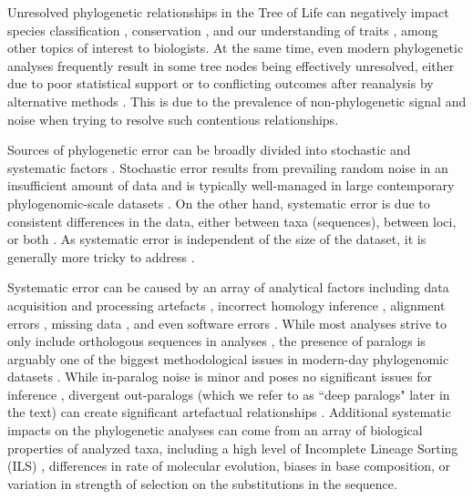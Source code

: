 \documentclass[../main.tex]{subfiles}
\begin{document}
Unresolved phylogenetic relationships in the Tree of Life can negatively impact species classification \citep{Som2015-et}, conservation \citep{Swenson2009-om}, and our understanding of traits \citep{}, among other topics of interest to biologists.
At the same time, even modern phylogenetic analyses frequently result in some tree nodes being effectively unresolved, either due to poor statistical support or to conflicting outcomes after reanalysis by alternative methods \citep{Rodriguez-Ezpeleta2007-vn, Smith2015-ae, Esselstyn2017-uc,Chakrabarty2017-ie}. This is due to the prevalence of non-phylogenetic signal and noise when trying to resolve such contentious relationships.

Sources of phylogenetic error can be broadly divided into stochastic and systematic factors \citep{Kapli2021-dd}. Stochastic error results from prevailing random noise in an insufficient amount of data \citep{Kapli2021-dd} and is typically well-managed in large contemporary phylogenomic-scale datasets \citep{Philippe2011-fv}. On the other hand, systematic error is due to consistent differences in the data, either between taxa (sequences), between loci, or both \citep{Kapli2021-dd, Philippe2011-fv}. As systematic error is independent of the size of the dataset, it is generally more tricky to address \citep{Philippe2011-fv, Jeffroy2006-th}.

Systematic error can be caused by an array of analytical factors including data acquisition and processing artefacts \citep{Simion2017-jz, Philippe2011-fv}, incorrect homology inference \citep{Fernandez2020-gb}, alignment errors \citep{Ranwez2020-le}, missing data \citep{Wiens2006-cm}, and even software errors \citep{Simion2020-ex}. While most analyses strive to only include orthologous sequences in analyses \citep{Boussau2020-bk, Fernandez2020-gb}, the presence of paralogs is arguably one of the biggest methodological issues in modern-day phylogenomic datasets \citep{Simion2020-ex, Brown2017-hn}. While in-paralog noise is minor and poses no significant issues for inference \citep{Yan2022-up}, divergent out-paralogs (which we refer to as ``deep paralogs" later in the text) can create significant artefactual relationships \citep{Springer2018-av, Springer2018-mk, Gatesy2017-zn}. Additional systematic impacts on the phylogenetic analyses can come from an array of biological properties of analyzed taxa, including a high level of Incomplete Lineage Sorting (ILS) \citep{Degnan2009-hn}, differences in rate of molecular evolution, biases in base composition, or variation in strength of selection on the substitutions in the sequence.
\end{document}
